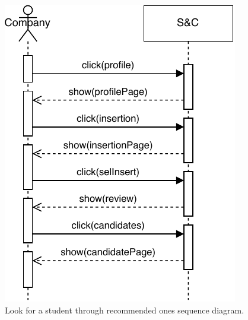 \begin{figure}[H]
    \begin{center}
        \includegraphics[width=\linewidth]{Images/SequenceDiagram/LookStudentSD.pdf}
        \caption{Look for a student through recommended ones sequence diagram.}
        \label{fig:look_student_seqdiag}%
    \end{center}
\end{figure}


